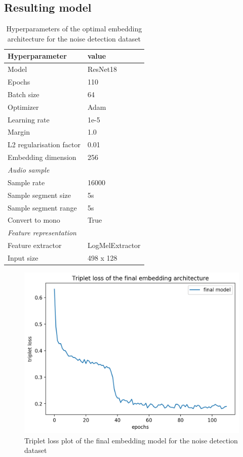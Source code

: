 \subsection{Resulting model}
\label{sub:Results-DCASE-Resulting-Model}
\begin{table}[ht]
    \centering
    \caption{Hyperparameters of the optimal embedding architecture for the noise detection dataset}
	\label{tab:Hyperparameters-DCASE}
    \begin{tabular}{l|l}
        \toprule
        \textbf{Hyperparameter} & \textbf{value} \\ 
        \midrule[1pt]
        Model & ResNet18 \\ 
        \hline
        Epochs & 110 \\ 
        \hline
        Batch size & 64 \\ 
        \hline
        Optimizer & Adam \\ 
        \hline
        Learning rate & 1e-5 \\
        \hline
        Margin & 1.0 \\
        \hline
        L2 regularisation factor & 0.01 \\
        \hline
        Embedding dimension & 256 \\
        \midrule[1pt]
        \multicolumn{2}{l}{\textit{Audio sample}} \\
        \midrule[1pt]
        Sample rate & 16000 \\ 
        \hline
        Sample segment size & 5s \\
        \hline
        Sample segment range & 5s \\
        \hline
        Convert to mono & True \\
        \midrule[1pt]
        \multicolumn{2}{l}{\textit{Feature representation}} \\
        \midrule[1pt]
        Feature extractor & LogMelExtractor \\ 
        \hline
        Input size & 498 x 128 \\
        \bottomrule
    \end{tabular}
\end{table}
\begin{figure}[ht]
\centering
    \includegraphics[width=0.6\linewidth]{img/Triplet_loss_DCASE_final.png}
    \caption{Triplet loss plot of the final embedding model for the noise detection dataset}
    \label{fig:Triplet-Loss-DCASE}
\end{figure}
